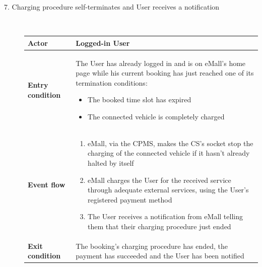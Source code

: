 \documentclass[11pt]{article}
\begin{document}
\begin{description}
    \item [7. Charging procedure self-terminates and User receives a notification] \hfill \\
    \begin{table}[H]
        \centering
        \setlength{\tabcolsep}{18pt}
        \renewcommand{\arraystretch}{1.4}
        \begin{tabularx}{\textwidth}{|>{\hsize=0.5\hsize}X|>{\hsize=1.5\hsize}X|}
            \hline
            \textbf{Actor} & Logged-in User \\
            \hline
            \textbf{Entry condition} & The User has already logged in and is on eMall's home page while his current booking has just reached one of its termination conditions:
            \begin{minipage}[t]{\hsize}
            \begin{itemize}
                \item The booked time slot has expired
                \item The connected vehicle is completely charged
            \end{itemize}
            \end{minipage}
            \vspace{6pt}
            \\
            \hline
            \textbf{Event flow} & 
                \begin{minipage}[t]{\hsize}
                \begin{enumerate}[topsep=0pt, leftmargin=*]
                    \item eMall, via the CPMS, makes the CS's socket stop the charging of the connected vehicle if it hasn't already halted by itself
                    \item eMall charges the User for the received service through adequate external services, using the User’s registered payment method
                    \item The User receives a notification from eMall telling them that their charging procedure just ended
                \end{enumerate}
                \end{minipage}
                \vspace{6pt}
            \\
            \hline
            \textbf{Exit condition} & The booking's charging procedure has ended, the payment has succeeded and the User has been notified \\

\end{tabularx}
\end{table}
\end{description}
\end{document}

